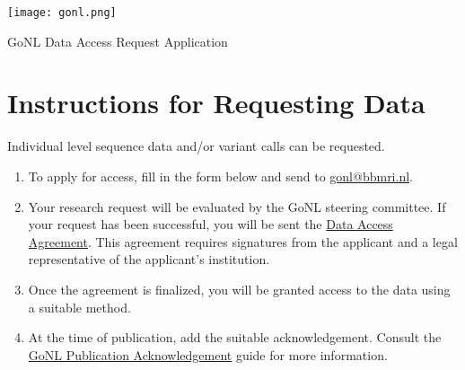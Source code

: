 \documentclass[a4paper,12pt]{article}
\begin{document}

\pagestyle{plain}

\texttt{[image: gonl.png]}

\vspace{0.6cm}

{\fontsize{21}{10}\selectfont GoNL Data Access Request Application}


\section*{Instructions for Requesting Data}

Individual level sequence data and/or variant calls can be requested. 

\begin{enumerate}
  \item To apply for access, fill in the form below and send to \href{mailto:gonl@bbmri.nl}{gonl@bbmri.nl}.
  \item Your research request will be evaluated by the GoNL steering committee. If your request has been successful, you will be sent the \href{https://go-nl.molgeniscloud.org/api/files/aaaac5wx7sgqv6qwh32jd7yaai?alt=media}{Data Access Agreement}. This agreement requires signatures from the applicant and a legal representative of the applicant’s institution. 
  \item Once the agreement is finalized, you will be granted access to the data using a suitable method. 
  \item At the time of publication, add the suitable acknowledgement. Consult the \href{https://go-nl.molgeniscloud.org/api/files/aaaac5z7aijfr6qwh32jd7yaae?alt=media}{GoNL Publication Acknowledgement} guide for more information.
\end{enumerate}
\end{document}
